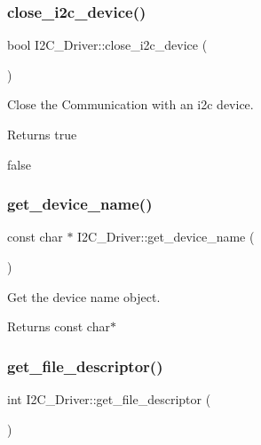 \subsubsection{\texorpdfstring{close\+\_\+i2c\+\_\+device()}{close\_i2c\_device()}}
{\footnotesize\ttfamily bool I2\+C\+\_\+\+Driver\+::close\+\_\+i2c\+\_\+device (\begin{DoxyParamCaption}{ }\end{DoxyParamCaption})}



Close the Communication with an i2c device. 

\begin{DoxyReturn}{Returns}
true 

false 
\end{DoxyReturn}
\mbox{\label{class_i2_c___driver_a9c1be344012ed2b3f808c32fc2cc4eb8}} 
\subsubsection{\texorpdfstring{get\+\_\+device\+\_\+name()}{get\_device\_name()}}
{\footnotesize\ttfamily const char $\ast$ I2\+C\+\_\+\+Driver\+::get\+\_\+device\+\_\+name (\begin{DoxyParamCaption}{ }\end{DoxyParamCaption})}



Get the device name object. 

\begin{DoxyReturn}{Returns}
const char$\ast$ 
\end{DoxyReturn}
\mbox{\label{class_i2_c___driver_a5c39bcab377ef93cba25f5a3793fbbd5}} 
\subsubsection{\texorpdfstring{get\+\_\+file\+\_\+descriptor()}{get\_file\_descriptor()}}
{\footnotesize\ttfamily int I2\+C\+\_\+\+Driver\+::get\+\_\+file\+\_\+descriptor (\begin{DoxyParamCaption}{ }\end{DoxyParamCaption})}



